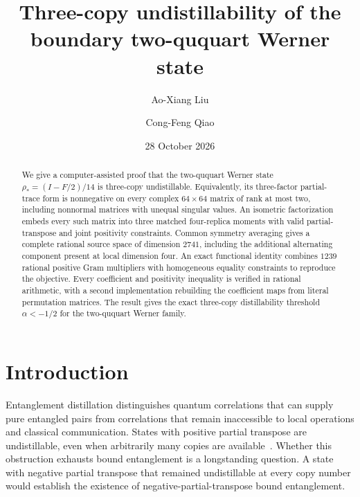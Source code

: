 \documentclass[aps,pra,reprint,superscriptaddress,amsmath,amssymb,floatfix,nofootinbib]{revtex4-2}
\begin{document}
\title{Three-copy undistillability of the boundary two-ququart Werner state}
\author{Ao-Xiang Liu}
\author{Cong-Feng Qiao}
\date{28 October 2026}
\begin{abstract}
We give a computer-assisted proof that the two-ququart Werner state
$\rho_*=(I-F/2)/14$ is three-copy undistillable.
Equivalently, its three-factor partial-trace form is nonnegative on every
complex $64\times64$ matrix of rank at most two, including nonnormal
matrices with unequal singular values.
An isometric factorization embeds every such matrix into three matched
four-replica moments with valid partial-transpose and joint positivity
constraints. Common symmetry averaging gives a complete rational source
space of dimension $2741$, including the additional alternating component
present at local dimension four.
An exact functional identity combines $1239$ rational positive Gram
multipliers with homogeneous equality constraints to reproduce the
objective. Every coefficient and positivity inequality is verified in
rational arithmetic, with a second implementation rebuilding the
coefficient maps from literal permutation matrices.
The result gives the exact three-copy distillability threshold
$\alpha<-1/2$ for the two-ququart Werner family.
\end{abstract}
\maketitle

\section{Introduction}
\label{sec:introduction}

Entanglement distillation distinguishes quantum correlations that can
supply pure entangled pairs from correlations that remain inaccessible
to local operations and classical communication. States with positive
partial transpose are undistillable, even when arbitrarily many copies
are available~\cite{HHH}. Whether this obstruction exhausts bound
entanglement is a longstanding question. A state with negative partial
transpose that remained undistillable at every copy number would establish
the existence of negative-partial-transpose bound entanglement.
\end{document}
